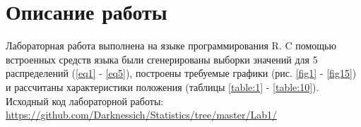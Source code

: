 \section{Описание работы}
Лабораторная работа выполнена на языке программирования R. C помощью встроенных средств языка были сгенерированы выборки значений для 5 распределений (\ref{eq1} - \ref{eq5}), построены требуемые графики (рис. \ref{fig1} - \ref{fig15}) и рассчитаны характеристики положения (таблицы \ref{table:1} - \ref{table:10}). Исходный код лабораторной работы: \url{https://github.com/Darknessich/Statistics/tree/master/Lab1/}